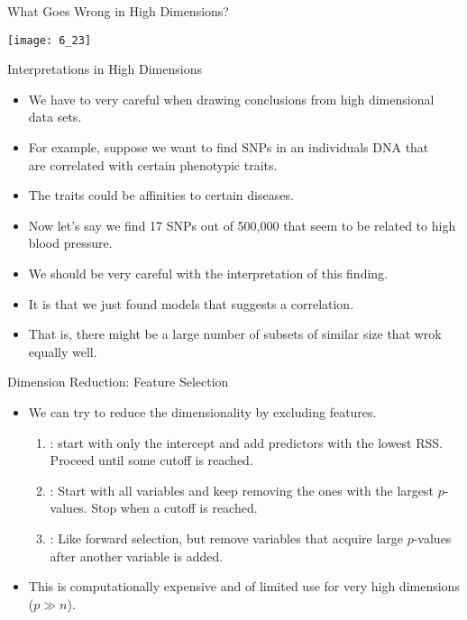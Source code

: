 \documentclass[mathserif, aspectratio=169]{beamer}
\begin{document}
\begin{frame}{What Goes Wrong in High Dimensions?}
	\begin{center}
		\texttt{[image: 6\_23]}
	\end{center}
\end{frame}

\begin{frame}{Interpretations in High Dimensions}
	\begin{itemize}
		\item We have to very careful when drawing conclusions from high dimensional
			data sets.
		\item For example, suppose we want to find SNPs in an individuals DNA that \\
			are correlated with certain phenotypic traits.
		\item The traits could be affinities to certain diseases. 
		\item Now let's say we find 17 SNPs out of 500,000 that seem to be related to
			high blood pressure.
		\item We should be very careful with the interpretation of this finding.
		\item It is  that we just found  models that suggests a correlation.
		\item That is, there might be a large number of subsets of similar size that wrok equally well.
	\end{itemize}
\end{frame}

\begin{frame}{Dimension Reduction: Feature Selection}
	\begin{itemize}
		\item We can try to reduce the dimensionality by excluding features.
			\begin{cpage}
				\begin{enumerate}
					\item {}: start with only the intercept and add
						predictors with the lowest RSS. Proceed until some cutoff is reached. 
					\item {}: Start with all variables and keep removing
						the ones with the largest $p$-values. Stop when a cutoff is reached.
					\item {}: Like forward selection, but remove variables
						that acquire large $p$-values after another variable is added.
				\end{enumerate}
			\end{cpage}
		\item This is computationally expensive and of limited use for very high
			dimensions ($p \gg n$).
	\end{itemize}
\end{frame}
\end{document}
